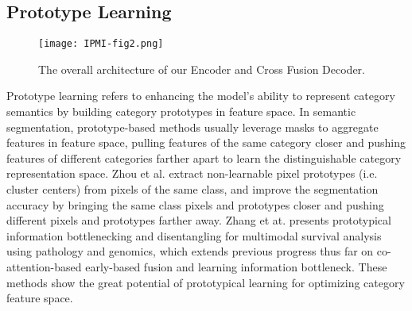 \subsection{Prototype Learning}
\begin{figure*}[th]
\texttt{[image: IPMI-fig2.png]}
\caption{The overall architecture of our Encoder and Cross Fusion Decoder.} 
\label{fig.2}
\end{figure*}
Prototype learning \cite{protoSeg,zhang2024prototypical,Prototype-tuning} refers to enhancing the model's ability to represent category semantics by building category prototypes in feature space. In semantic segmentation, prototype-based methods usually leverage masks to aggregate features in feature space, pulling features of the same category closer and pushing features of different categories farther apart to learn the distinguishable category representation space.
Zhou et al. \cite{protoSeg} extract non-learnable pixel prototypes (i.e. cluster centers) from pixels of the same class, and improve the segmentation accuracy by bringing the same class pixels and prototypes closer and pushing different pixels and prototypes farther away. Zhang et at. \cite{zhang2024prototypical} presents prototypical information bottlenecking and disentangling for multimodal survival analysis using pathology and genomics, which extends previous progress thus far on co-attention-based early-based fusion and learning information bottleneck. These methods show the great potential of prototypical learning for optimizing category feature space.